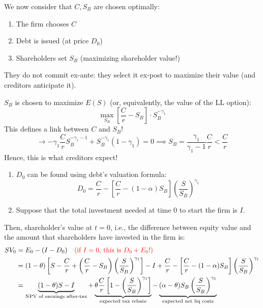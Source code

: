 {\color{red}We now consider that $C, S_B$ are chosen optimally:}

\begin{enumerate}
    \item The firm chooses $C$
    \item Debt is issued (at price $D_0$)
    \item Shareholders set $S_B$ (maximizing shareholder value!)
\end{enumerate}
They do not commit ex-ante: they select it ex-post to maximize their value (and creditors anticipate it).

$S_B$ is chosen to maximize $E(S)$ (or, equivalently, the value of the LL option):
\begin{equation*}
    \max_{S_B} \left[ \frac{C}{r} - S_B \right] \cdot S_B^{-\gamma_1}
\end{equation*}
This defines a link between $C$ and $S_B$!
\begin{equation*}
    \rightarrow -\gamma_1 \frac{C}{r} S_B^{-\gamma_1-1} + S_B^{-\gamma_1}(1-\gamma_1) = 0 \implies S_B = \frac{\gamma_1}{\gamma_1-1} \frac{C}{r} < \frac{C}{r}
\end{equation*}
Hence, this is what creditors expect!

\begin{enumerate}
    \item[2)] $D_0$ can be found using debt's valuation formula:
    \begin{equation*}
        D_0 = \frac{C}{r} - \left[ \frac{C}{r} - (1-\alpha) S_B \right] \left( \frac{S}{S_B} \right)^{\gamma_1}
    \end{equation*}
    \item[3)] Suppose that the total investment needed at time 0 to start the firm is $I$.
\end{enumerate}

Then, shareholder's value at $t=0$, i.e., the difference between equity value and the amount that shareholders have invested in the firm is:
\begin{align*}
    SV_0 &= E_0 - (I - D_0) \quad \text{\color{red}(if $I=0$, this is $D_0 + E_0$!)} \\
    &= (1-\theta) \left[ S - \frac{C}{r} + \left( \frac{C}{r} - S_B \right) \left( \frac{S}{S_B} \right)^{\gamma_1} \right] - I + \frac{C}{r} - \left[ \frac{C}{r} - (1-\alpha) S_B \right] \left( \frac{S}{S_B} \right)^{\gamma_1} \\
    &= \underbrace{(1-\theta)S - I}_{\text{NPV of earnings after-tax}} + \underbrace{\theta \frac{C}{r} \left[ 1 - \left( \frac{S}{S_B} \right)^{\gamma_1} \right]}_{\text{expected tax rebate}} - \underbrace{(\alpha - \theta) S_B \left( \frac{S}{S_B} \right)^{\gamma_1}}_{\text{expected net liq costs}}
\end{align*}

